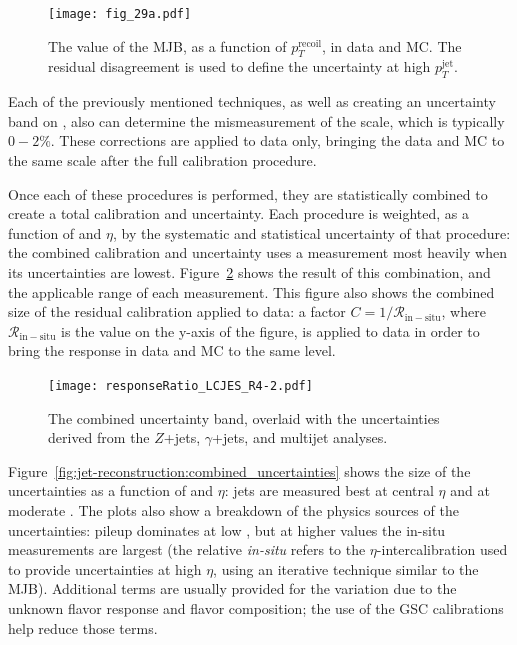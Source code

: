 
\begin{figure}
\centering
\texttt{[image: fig\_29a.pdf]}
\label{fig:jet-reconstruction:mjb}
\caption{The value of the MJB, as a function of $p_T^\mathrm{recoil}$, in data and MC. The residual disagreement is used to define the uncertainty at high $p_T^\mathrm{jet}$.}
\end{figure}



Each of the previously mentioned techniques, as well as creating an uncertainty band on \pt, also can determine the mismeasurement of the scale, which is typically $0-2\%$. These corrections are applied to data only, bringing the data and MC to the same scale after the full calibration procedure.

Once each of these procedures is performed, they are statistically combined to create a total calibration and uncertainty. Each procedure is weighted, as a function of \pt and $\eta$, by the systematic and statistical uncertainty of that procedure: the combined calibration and uncertainty uses a measurement most heavily when its uncertainties are lowest. Figure~\ref{fig:jet-reconstruction:combined_jes} shows the result of this combination, and the applicable range of each measurement. This figure also shows the combined size of the residual calibration applied to data: a factor $C = 1/\mathcal{R}_\mathrm{in-situ}$, where $\mathcal{R}_\mathrm{in-situ}$ is the value on the y-axis of the figure, is applied to data in order to bring the response in data and MC to the same level.


\begin{figure}
\centering
\texttt{[image: responseRatio\_LCJES\_R4-2.pdf]}
\label{fig:jet-reconstruction:combined_jes}
\caption{The combined uncertainty band, overlaid with the uncertainties derived from the $Z$+jets, $\gamma$+jets, and multijet analyses.}
\end{figure}


Figure~\ref{fig:jet-reconstruction:combined_uncertainties} shows the size of the uncertainties as a function of \pt and $\eta$: jets are measured best at central $\eta$ and at moderate \pt. The plots also show a breakdown of the physics sources of the uncertainties: pileup dominates at low \pt, but at higher values the in-situ measurements are largest (the relative \textit{in-situ} refers to the $\eta$-intercalibration used to provide uncertainties at high $\eta$, using an iterative technique similar to the MJB). Additional terms are usually provided for the variation due to the unknown flavor response and flavor composition; the use of the GSC calibrations help reduce those terms.

